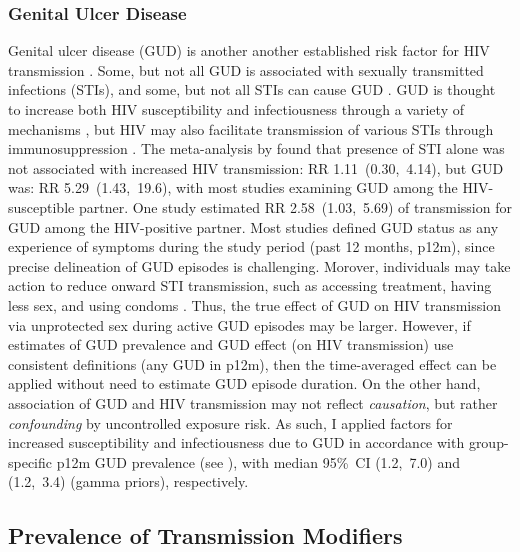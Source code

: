 \subsubsection{Genital Ulcer Disease}\label{model.par.beta.gud}
Genital ulcer disease (GUD)
is another another established risk factor for HIV transmission \cite{Plummer1991,Fleming1999}.
Some, but not all GUD is associated with sexually transmitted infections (STIs),
and some, but not all STIs can cause GUD \cite{Fleming1999}.
GUD is thought to increase both HIV susceptibility and infectiousness
through a variety of mechanisms \cite{Fleming1999,Sheffield2007,Fox2010},
but HIV may also facilitate transmission of various STIs
through immunosuppression \cite{Wasserheit1992}.
The meta-analysis by \citet{Boily2009} found that
presence of STI alone was not associated with increased HIV transmission: RR 1.11~(0.30,~4.14),
but GUD was: RR 5.29~(1.43,~19.6),
with most studies examining GUD among the HIV-susceptible partner.
One study \cite{Gray2001} estimated RR 2.58~(1.03,~5.69) of transmission
for GUD among the HIV-positive partner.
Most studies defined GUD status as any experience of symptoms during the study period
(\eg past 12 months, p12m),
since precise delineation of GUD episodes is challenging.
Morover, individuals may take action to reduce onward STI transmission,
such as accessing treatment, having less sex, and using condoms \cite{SDHS2006}.
Thus, the true effect of GUD on HIV transmission
via unprotected sex during active GUD episodes may be larger.
However, if estimates of GUD prevalence and GUD effect (on HIV transmission)
use consistent definitions (\eg any GUD in p12m),
then the time-averaged effect can be applied without need to estimate GUD episode duration.
On the other hand, association of GUD and HIV transmission may not reflect \emph{causation},
but rather \emph{confounding} by uncontrolled exposure risk.
As such, I applied factors for increased susceptibility and infectiousness due to GUD
in accordance with group-specific p12m GUD prevalence (see ),
with median 95\%~CI (1.2,~7.0) and (1.2,~3.4) (gamma priors), respectively.
\subsection{Prevalence of Transmission Modifiers}\label{model.par.tm}
